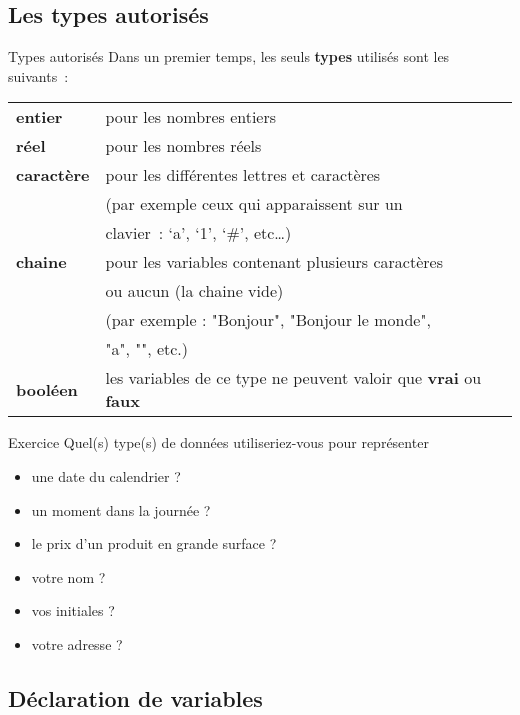 \subsection{Les types autorisés}

\begin{frame}{Types autorisés}
	Dans un premier temps, les seuls \textbf{types} utilisés sont les
	suivants~:
	
	\bigskip
	
	\begin{tabular}{p{1.6cm}|p{11.5cm}}
	\raggedleft  \textbf{entier} &
	 pour les nombres entiers\\
	\raggedleft  \textbf{réel} &
	 pour les nombres réels\\
	\raggedleft  \textbf{caractère} &
	 pour les différentes lettres et caractères \\
	{~} & (par exemple ceux qui apparaissent sur un \\
	{~} & clavier~: ‘a’, ‘1’, ‘\#’, etc…)\\
	\raggedleft  \textbf{chaine} &
	pour les variables contenant plusieurs
	caractères\\
	{~} & ou aucun (la chaine vide) \\
	{~} &	(par exemple : "Bonjour", "Bonjour le monde",  \\
	{~} &	"a", "", etc.)
	\\
	\raggedleft  \textbf{booléen} &
	 les variables de ce type ne peuvent valoir que
	\textbf{vrai} ou \textbf{faux}\\
	\end{tabular}
\end{frame}

\begin{frame}{Exercice}
	Quel(s) type(s) de données utiliseriez-vous 
	pour représenter 
	\begin{itemize}
		\item une date du calendrier ?
		\item un moment dans la journée ?
		\item le prix d'un produit en grande surface ?
		\item votre nom ?
		\item vos initiales ?
		\item votre adresse ?
	\end{itemize}	
\end{frame}

\subsection{Déclaration de variables}

